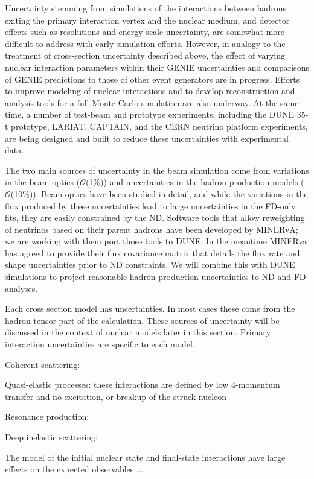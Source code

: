 Uncertainty stemming from simulations of the interactions between hadrons
exiting the primary interaction vertex and the nuclear medium, and detector effects
such as resolutions and energy scale uncertainty, are somewhat more difficult to address with early
simulation efforts. However, in analogy to the treatment of cross-section uncertainty described above,
the effect of varying nuclear interaction parameters within their GENIE
uncertainties and comparisons of GENIE predictions to those of other
event generators are in progress.
Efforts to improve modeling of nuclear interactions and to develop 
reconstruction and analysis tools for a full Monte Carlo simulation are also underway. 
At the same time,
a number of test-beam and prototype experiments, including the DUNE 35-t prototype,
LARIAT, CAPTAIN, and the CERN neutrino platform experiments, are being designed and built to reduce these
uncertainties with experimental data.

The two main sources of uncertainty in the beam simulation come from variations in the beam optics
($\mathcal{O}$(1\%)) and uncertainties in the hadron production models ($\mathcal{O}$(10\%)).
Beam optics have been studied in detail, and while the variations in the flux produced by these uncertainties
lead to large uncertainties in the FD-only fits, they are easily constrained by the ND. Software tools that
allow reweighting of neutrinos based on their parent hadrons have been developed by MINERvA; we are working with
them port those tools to DUNE. In the meantime MINERva has agreed to provide their flux covariance matrix
that details the flux rate and shape uncertainties prior to ND constraints. We will combine this with DUNE
simulations to project reasonable hadron production uncertainties to ND and FD analyses.

Each cross section model has uncertainties. In most cases these come from the hadron tensor part of the
calculation. These sources of uncertainty will be discussed in the context of nuclear models later in this
section. Primary interaction uncertainties are specific to each model.

  Coherent scattering: 

  Quasi-elastic processes: these interactions are defined by low 4-momentum transfer and no excitation,
    or breakup of the struck nucleon

  Resonance production:

  Deep inelastic scattering:

The model of the initial nuclear state and final-state interactions have large effects on the
expected observables ...
